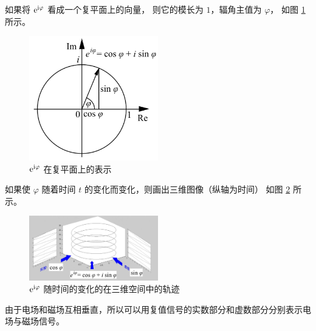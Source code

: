 \begin{example}[复值信号的图示]
    如果将 $\mathrm{e}^{\mathrm{i} \varphi}$ 看成一个复平面上的向量，
    则它的模长为 $1$，辐角主值为 $\varphi$，
    如图 \ref{fig:euler-formula-imaginary-plane} 所示。
    \begin{figure}[htbp]
        \centering
        \includegraphics[width=0.5\textwidth]{chap1/img/euler-formula-imaginary-plane.png}
        \caption{$\mathrm{e}^{\mathrm{i} \varphi}$ 在复平面上的表示}
        \label{fig:euler-formula-imaginary-plane}
    \end{figure}

    如果使 $\varphi$ 随着时间 $t$ 的变化而变化，则画出三维图像（纵轴为时间）
    如图 \ref{fig:euler-formula-imaginary-signals.png} 所示。
    \begin{figure}[htbp]
        \centering
        \includegraphics[width=0.5\textwidth]{chap1/img/euler-formula-imaginary-signals.png}
        \caption{$\mathrm{e}^{\mathrm{i} \varphi}$ 随时间的变化的在三维空间中的轨迹}
        \label{fig:euler-formula-imaginary-signals.png}
    \end{figure}
\end{example}

\begin{example}[复值信号在电磁场中的应用]
    由于电场和磁场互相垂直，所以可以用复值信号的实数部分和虚数部分分别表示电场与磁场信号。
\end{example}

